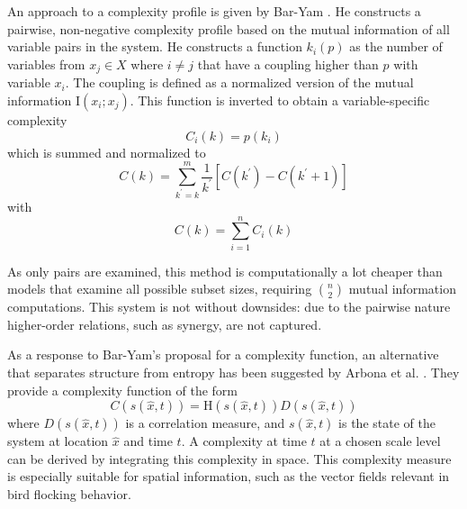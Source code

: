 \documentclass[../main.tex]{subfiles}
\begin{document}
An approach to a complexity profile is given by Bar-Yam \cite{bar2013computationally}.
He constructs a pairwise, non-negative complexity profile based on the mutual information of all variable pairs in the system.
He constructs a function $k_i (p)$ as the number of variables from $x_j \in X$ where $i \ne j$ that have a coupling higher than $p$ with variable $x_i$.
The coupling is defined as a normalized version of the mutual information $\mathrm{I}\left( x_i;x_j \right)$.
This function is inverted to obtain a variable-specific complexity
\begin{equation}
\overset{~}{C}_i\left( k \right)  = p \left( k_i\right)
\end{equation}
%
which is summed and normalized to
%
\begin{equation}
C\left( k \right)  = \sum_{k^\prime= k}^m \frac{1}{k^\prime} [\overset{~}{C} \left( k^\prime \right) - \overset{~}{C} \left( k^\prime + 1 \right) ]
\end{equation}
%
with
%
\begin{equation}
\overset{~}{C} \left( k \right)  = \sum_{i=1}^n \overset{~}{C}_i \left( k \right) 
\end{equation}

As only pairs are examined, this method is computationally a lot cheaper than models that examine all possible subset sizes, requiring $\binom{n}{2}$ mutual information computations.
This system is not without downsides: due to the pairwise nature higher-order relations, such as synergy, are not captured.

As a response to Bar-Yam's proposal for a complexity function, an alternative that separates structure from entropy has been suggested by Arbona et al. \cite{arbona2014statistical}.
They provide a complexity function of the form
%
\begin{equation}
C\left( s\left( \hat{x},t \right) \right) = \mathrm{H}\left( s\left( \hat{x},t \right) \right) D\left( s\left( \hat{x},t \right) \right)
\end{equation}
%
where $D\left( s\left( \hat{x},t \right) \right)$ is a correlation measure, and $s\left( \hat{x},t \right) $ is the state of the system at location $\hat{x}$ and time $t$.
A complexity at time $t$ at a chosen scale level can be derived by integrating this complexity in space.
This complexity measure is especially suitable for spatial information, such as the vector fields relevant in bird flocking behavior.
\end{document}
